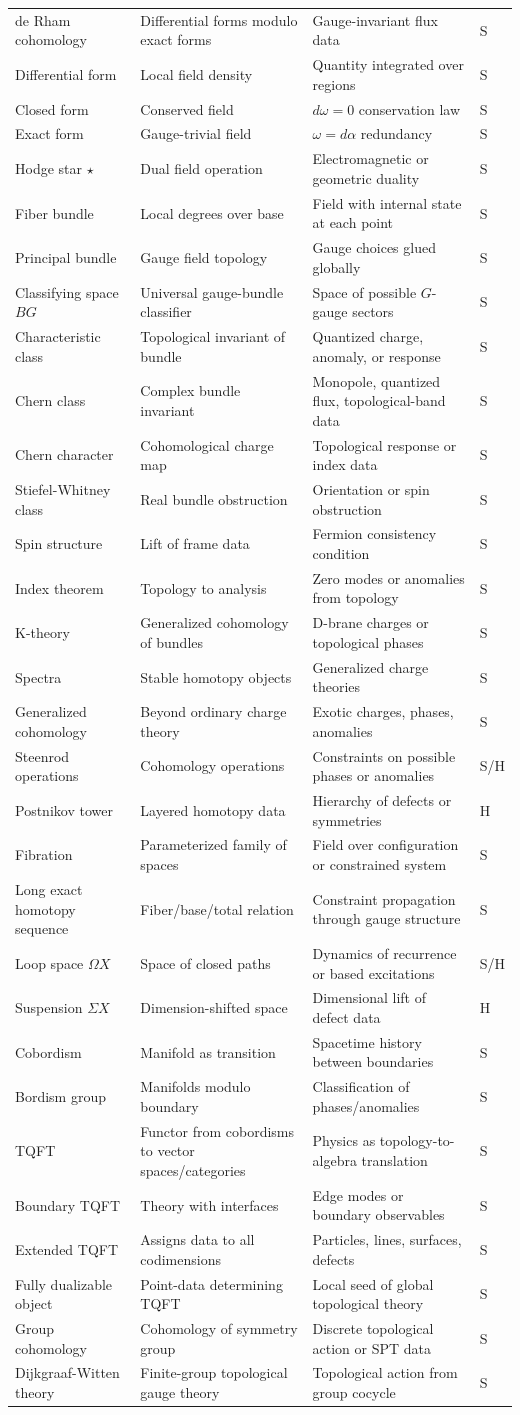 \documentclass[11pt]{article}
\newcommand{\status}[1]{\textsf{#1}}
\newcommand{\entry}[4]{#1 & #2 & #3 & \status{#4}\\}
\begin{document}
\begin{longtable}{@{}>{\raggedright\arraybackslash}p{}>{\raggedright\arraybackslash}p{}>{\raggedright\arraybackslash}p{}>{\centering\arraybackslash}p{}@{}}
\entry{de Rham cohomology}{Differential forms modulo exact forms}{Gauge-invariant flux data}{S}
\entry{Differential form}{Local field density}{Quantity integrated over regions}{S}
\entry{Closed form}{Conserved field}{$d\omega=0$ conservation law}{S}
\entry{Exact form}{Gauge-trivial field}{$\omega=d\alpha$ redundancy}{S}
\entry{Hodge star $\star$}{Dual field operation}{Electromagnetic or geometric duality}{S}
\entry{Fiber bundle}{Local degrees over base}{Field with internal state at each point}{S}
\entry{Principal bundle}{Gauge field topology}{Gauge choices glued globally}{S}
\entry{Classifying space $BG$}{Universal gauge-bundle classifier}{Space of possible $G$-gauge sectors}{S}
\entry{Characteristic class}{Topological invariant of bundle}{Quantized charge, anomaly, or response}{S}
\entry{Chern class}{Complex bundle invariant}{Monopole, quantized flux, topological-band data}{S}
\entry{Chern character}{Cohomological charge map}{Topological response or index data}{S}
\entry{Stiefel-Whitney class}{Real bundle obstruction}{Orientation or spin obstruction}{S}
\entry{Spin structure}{Lift of frame data}{Fermion consistency condition}{S}
\entry{Index theorem}{Topology to analysis}{Zero modes or anomalies from topology}{S}
\entry{K-theory}{Generalized cohomology of bundles}{D-brane charges or topological phases}{S}
\entry{Spectra}{Stable homotopy objects}{Generalized charge theories}{S}
\entry{Generalized cohomology}{Beyond ordinary charge theory}{Exotic charges, phases, anomalies}{S}
\entry{Steenrod operations}{Cohomology operations}{Constraints on possible phases or anomalies}{S/H}
\entry{Postnikov tower}{Layered homotopy data}{Hierarchy of defects or symmetries}{H}
\entry{Fibration}{Parameterized family of spaces}{Field over configuration or constrained system}{S}
\entry{Long exact homotopy sequence}{Fiber/base/total relation}{Constraint propagation through gauge structure}{S}
\entry{Loop space $\Omega X$}{Space of closed paths}{Dynamics of recurrence or based excitations}{S/H}
\entry{Suspension $\Sigma X$}{Dimension-shifted space}{Dimensional lift of defect data}{H}
\entry{Cobordism}{Manifold as transition}{Spacetime history between boundaries}{S}
\entry{Bordism group}{Manifolds modulo boundary}{Classification of phases/anomalies}{S}
\entry{TQFT}{Functor from cobordisms to vector spaces/categories}{Physics as topology-to-algebra translation}{S}
\entry{Boundary TQFT}{Theory with interfaces}{Edge modes or boundary observables}{S}
\entry{Extended TQFT}{Assigns data to all codimensions}{Particles, lines, surfaces, defects}{S}
\entry{Fully dualizable object}{Point-data determining TQFT}{Local seed of global topological theory}{S}
\entry{Group cohomology}{Cohomology of symmetry group}{Discrete topological action or SPT data}{S}
\entry{Dijkgraaf-Witten theory}{Finite-group topological gauge theory}{Topological action from group cocycle}{S}
\end{longtable}
\end{document}
